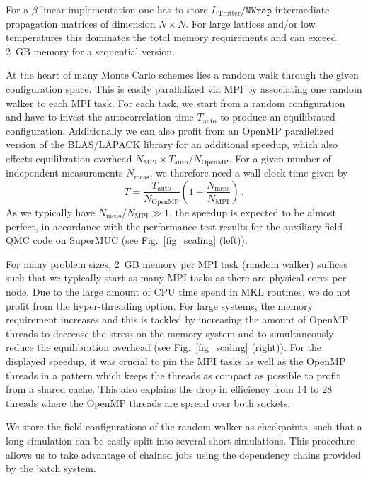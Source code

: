 For a $\beta$-linear implementation one has to store $L_{\text{Trotter}}/\texttt{NWrap}$ intermediate propagation matrices of dimension $N\times N$. For large lattices and/or low temperatures this dominates the total memory requirements and can exceed 2~GB memory for a sequential version.

At the heart of many Monte Carlo schemes lies a random walk through the given configuration space. This is easily parallalized via MPI by associating one random walker to each MPI task. For each task, we start from a random configuration and have to invest the autocorrelation time $T_\mathrm{auto}$ to produce an equilibrated configuration.
Additionally we can also profit from an OpenMP parallelized version of the BLAS/LAPACK library for an additional speedup, which also effects equilibration overhead $N_\text{MPI}\times T_\text{auto} / N_\text{OpenMP}$. For a given number of independent measurements  $N_\text{meas}$, we  therefore need a wall-clock time given by
\begin{equation}\label{eqn:scaling}
T  =  \frac{T_\text{auto}}{N_\text{OpenMP}} \left( 1   +    \frac{N_\text{meas}}{N_\text{MPI}}  \right) \,.
\end{equation}
As we typically have $ N_\text{meas}/N_\text{MPI} \gg 1 $, 
the speedup is expected to be almost perfect, in accordance with
the performance test results for the auxiliary-field
QMC code on SuperMUC (see Fig.~\ref{fig_scaling} (left)).

For many problem sizes, 2~GB memory per MPI task (random walker) suffices such that we typically start as many MPI tasks as there are physical cores per node. Due to the large amount of CPU time spend in MKL routines, we do not profit from the hyper-threading option. For large systems, the memory requirement increases and this is tackled by increasing the amount of OpenMP threads to decrease the stress on the memory system and to simultaneously reduce the equilibration overhead (see Fig.~\ref{fig_scaling} (right)). For the displayed speedup, it was crucial to pin the MPI tasks as well as the OpenMP threads in a pattern which keeps the threads as compact as possible to profit from a shared cache. This also explains the drop in efficiency from 14 to 28 threads where the OpenMP threads are spread over both sockets. 

We store the field configurations of the random walker as checkpoints, such that a long simulation can be easily split into several short simulations. This procedure allows us to take advantage of chained jobs using the dependency chains provided by the batch system.

